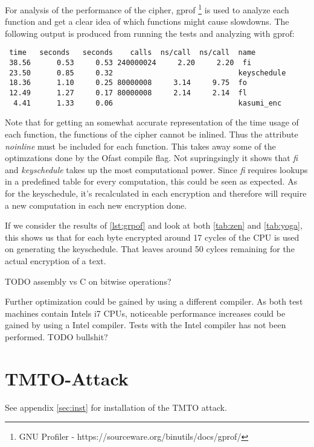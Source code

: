 For analysis of the performance of the cipher, gprof \footnote{GNU
  Profiler - https://sourceware.org/binutils/docs/gprof/} is used to
analyze each function and get a clear idea of which functions might
cause slowdowns. The following output is produced from running the
tests and analyzing with gprof:
\begin{lstlisting}[caption=Gprof output,captionpos=b,label=lst:grpof]
    %   cumulative   self              self     total
 time   seconds   seconds    calls  ns/call  ns/call  name
 38.56      0.53     0.53 240000024     2.20     2.20  fi
 23.50      0.85     0.32                             keyschedule
 18.36      1.10     0.25 80000008     3.14     9.75  fo
 12.49      1.27     0.17 80000008     2.14     2.14  fl
  4.41      1.33     0.06                             kasumi_enc
\end{lstlisting}
Note that for getting an somewhat accurate representation of the time usage of
each function, the functions of the cipher cannot be inlined. Thus the
attribute \textit{noinline} must be included for each function. This
takes away some of the optimzations done by the Ofast compile
flag. Not supringsingly it shows that \textit{fi} and
\textit{keyschedule} takes up the most computational
power. Since \textit{fi} requires lookups in a predefined table for every computation, this
could be seen as expected. As for the keyschedule, it's recalculated
in each encryption and therefore will require a new computation in
each new encryption done.

If we consider the results of \ref{lst:grpof} and look at both
\ref{tab:zen} and \ref{tab:yoga}, this shows us that for each byte
encrypted around 17 cycles of the CPU is used on generating the
keyschedule. That leaves around 50 cylces remaining for the actual
encryption of a text.

TODO assembly vs C on bitwise operations?

Further optimization could be gained by using a different compiler. As
both test machines contain Intels i7 CPUs, noticeable performance
increases could be gained by using a Intel compiler. Tests with the
Intel compiler has not been performed. TODO bullshit?


\section{TMTO-Attack}

See appendix \ref{sec:inst} for installation of the TMTO attack.

